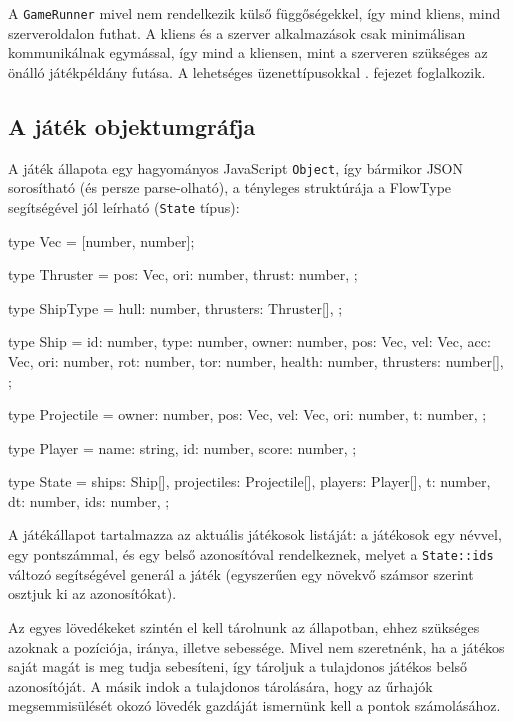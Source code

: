 A \texttt{GameRunner} mivel nem rendelkezik külső függőségekkel, így mind
kliens, mind szerveroldalon futhat. A kliens és a szerver alkalmazások csak
minimálisan kommunikálnak egymással, így mind a kliensen, mint a szerveren
szükséges az önálló játékpéldány futása. A lehetséges üzenettípusokkal
. fejezet foglalkozik.

\subsection{A játék objektumgráfja}\label{sec:gamestate}

A játék állapota egy hagyományos JavaScript \texttt{Object}, így bármikor JSON
sorosítható (és persze parse-olható), a tényleges struktúrája a FlowType
segítségével jól leírható (\texttt{State} típus):

\begin{js}
type Vec = [number, number];

type Thruster = {
  pos: Vec, ori: number, thrust: number,
};

type ShipType = {
  hull: number,
  thrusters: Thruster[],
};

type Ship = {
  id: number,
  type: number,
  owner: number,
  pos: Vec, vel: Vec, acc: Vec,
  ori: number, rot: number, tor: number,
  health: number,
  thrusters: number[],
};

type Projectile = {
  owner: number,
  pos: Vec, vel: Vec, ori: number, t: number,
};

type Player = {
  name: string,
  id: number,
  score: number,
};

type State = {
  ships: Ship[],
  projectiles: Projectile[],
  players: Player[],
  t: number,
  dt: number,
  ids: number,
};
\end{js}

A játékállapot tartalmazza az aktuális játékosok listáját: a játékosok egy
névvel, egy pontszámmal, és egy belső azonosítóval rendelkeznek, melyet a
\texttt{State::ids} változó segítségével generál a játék (egyszerűen egy növekvő
számsor szerint osztjuk ki az azonosítókat).

Az egyes lövedékeket szintén el kell tárolnunk az állapotban, ehhez szükséges
azoknak a pozíciója, iránya, illetve sebessége. Mivel nem szeretnénk, ha a
játékos saját magát is meg tudja sebesíteni, így tároljuk a tulajdonos játékos
belső azonosítóját. A másik indok a tulajdonos tárolására, hogy az űrhajók
megsemmisülését okozó lövedék gazdáját ismernünk kell a pontok számolásához.

